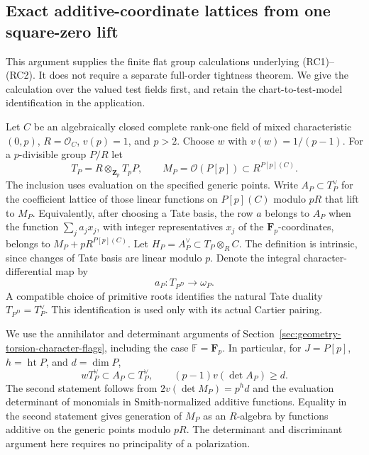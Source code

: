 \subsection{Exact additive-coordinate lattices from one square-zero lift}
\label{sec:geometry-witt-additive-lattice}

This argument supplies the finite flat group calculations underlying
(RC1)--(RC2). It does not require a separate full-order tightness theorem.
We give the calculation over the valued test fields first, and retain
the chart-to-test-model identification in the application.

Let \(C\) be an algebraically closed complete rank-one field of mixed
characteristic \((0,p)\), \(R=\mathcal O_C\), \(v(p)=1\), and \(p>2\).
Choose \(w\) with \(v(w)=1/(p-1)\).
For a \(p\)-divisible group \(P/R\) let
\[
 T_P=R\otimes_{\mathbf Z_p}T_pP,\qquad
 M_P=\mathcal O(P[p])\subset R^{P[p](C)}.
\]
The inclusion uses evaluation on the specified generic points.
Write \(A_P\subset T_P^\vee\) for the coefficient lattice of those
linear functions on \(P[p](C)\) modulo \(pR\) that lift to \(M_P\).
Equivalently, after choosing a Tate basis, the row \(a\) belongs to
\(A_P\) when the function \(\sum_j a_j x_j\), with integer
representatives \(x_j\) of the \(\mathbf F_p\)-coordinates, belongs
to \(M_P+pR^{P[p](C)}\).
Let \(H_P=A_P^\vee\subset T_P\otimes_R C\).
The definition is intrinsic, since changes of Tate basis are linear
modulo \(p\). Denote the integral character-differential map by
\[
 a_P:T_{P^D}\longrightarrow\omega_P.
\]
A compatible choice of primitive roots identifies the natural Tate
duality \(T_{P^D}=T_P^\vee\). This identification is used only
with its actual Cartier pairing.

We use the annihilator and determinant arguments of
Section~\ref{sec:geometry-torsion-character-flags}, including the
case \(\mathbb F=\mathbf F_p\). In particular, for \(J=P[p]\),
\(h=\operatorname{ht} P\), and \(d=\dim P\),
\begin{equation}\label{eq:aal-bound}
 wT_P^\vee\subset A_P\subset T_P^\vee,\qquad
 (p-1)v(\det A_P)\ge d.
\end{equation}
The second statement follows from
\(2v(\det M_P)=p^h d\) and the evaluation determinant of
monomials in Smith-normalized additive functions.
Equality in the second statement gives generation of \(M_P\)
as an \(R\)-algebra by functions additive on the generic points
modulo \(pR\). The determinant and discriminant argument here
requires no principality of a polarization.

